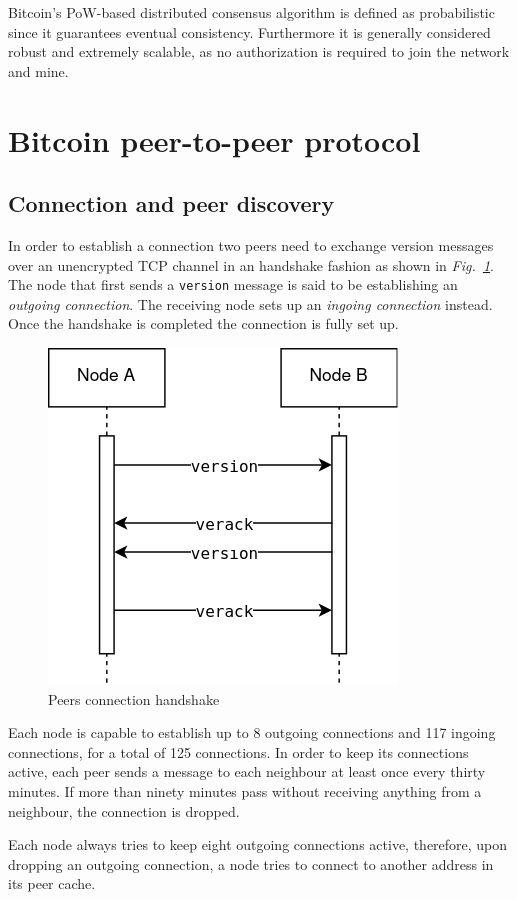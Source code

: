 \documentclass[12pt, letterpaper, twoside]{article}
\begin{document}
Bitcoin's PoW-based distributed consensus algorithm is defined as probabilistic since it guarantees eventual consistency. Furthermore it is generally considered robust and extremely scalable, as no authorization is required to join the network and mine.


\section{Bitcoin peer-to-peer protocol}\label{sec:netintro}
\subsection{Connection and peer discovery}\label{sec:peerdisc}
In order to establish a connection two peers need to exchange version messages over an unencrypted TCP channel in an handshake fashion as shown in \emph{Fig.~\ref{fig:btcconn}}. The node that first sends a \texttt{version} message is said to be establishing an \emph{outgoing connection}. The receiving node sets up an \emph{ingoing connection} instead. Once the handshake is completed the connection is fully set up.

\begin{figure}[h]
	\includegraphics[width=.45\textwidth]{pict/BTCconnection.png}
	\centering
	\caption{Peers connection handshake}
	\label{fig:btcconn}
\end{figure}

Each node is capable to establish up to 8 outgoing connections and 117 ingoing connections, for a total of 125 connections. In order to keep its connections active, each peer sends a message to each neighbour at least once every thirty minutes. If more than ninety minutes pass without receiving anything from a neighbour, the connection is dropped.

Each node always tries to keep eight outgoing connections active, therefore, upon dropping an outgoing connection, a node tries to connect to another address in its peer cache.\\
\end{document}
